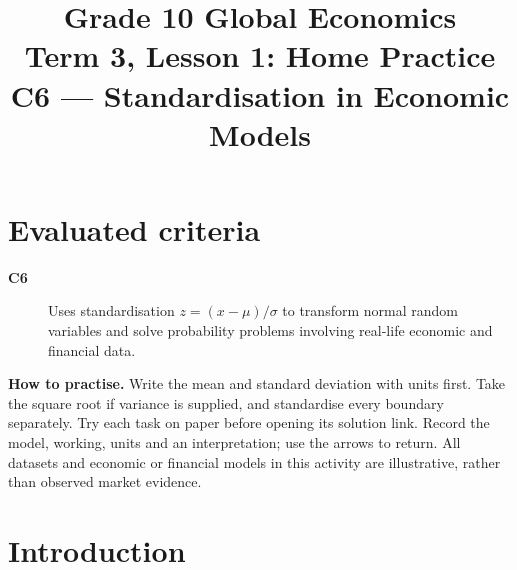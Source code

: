 \makeatletter
{}
\makeatother




\title{Grade 10 Global Economics\\Term 3, Lesson 1: Home Practice\\C6 --- Standardisation in Economic Models}
\author{}
\date{}

\maketitle
\setcounter{tocdepth}{1}
\setcounter{secnumdepth}{2}
\label{toc}
\tableofcontents
\section*{Evaluated criteria}
\begin{description}
\item[\textbf{C6}] Uses standardisation \(z=(x-\mu)/\sigma\) to transform normal random variables and solve probability problems involving real-life economic and financial data.
\end{description}
\textbf{How to practise.} Write the mean and standard deviation with units first. Take the square root if variance is supplied, and standardise every boundary separately. Try each task on paper before opening its solution link. Record the model, working, units and an interpretation; use the arrows to return.
All datasets and economic or financial models in this activity are illustrative, rather than observed market evidence.

\clearpage
\section{Introduction}\label{sec:introduction}
